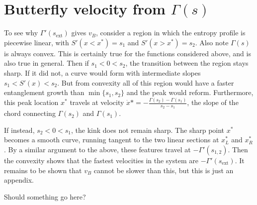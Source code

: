 \documentclass[aps,prx,reprint,superscriptaddress, longbibliography]{revtex4-1}
\newcommand{\charlie}[1]{ {\color{Magenta} {{#1}}}}
\begin{document}
\appendix
	
\section{Butterfly velocity from $\Gamma(s)$}

To see why $\Gamma'(s_\text{ext})$ gives $v_B$, consider a region in which the entropy profile is piecewise linear, with $S'(x<x^*)=s_1$ and $S'(x>x^*)=s_2$. Also note $\Gamma(s)$ is always convex. This is certainly true for the functions considered above, and is also true in general. Then if $s_1<0<s_2$, the transition between the region stays sharp. If it did not, a curve would form with intermediate slopes $s_1<S'(x)<s_2$. But from convexity all of this region would have a faster entanglement growth than $\min\{s_1,s_2\}$ and the peak would reform. Furthermore, this peak location $x^*$ travels at velocity $\dot{x}*=-\frac{\Gamma(s_2)-\Gamma(s_1)}{s_2-s_1}$, the slope of the chord connecting $\Gamma(s_2)$ and $\Gamma(s_1)$.

If instead, $s_2<0<s_1$, the kink does not remain sharp. The sharp point $x^*$ becomes a smooth curve, running tangent to the two linear sections at $x^*_L$ and $x^*_R$. By a similar argument to the above, these features travel at $-\Gamma'(s_{1,2})$. Then the convexity shows that the fastest velocities in the system are $-\Gamma'(s_\text{ext})$. It remains to be shown that $v_B$ cannot be slower than this, but this is just an appendix.



\begin{appendix}
	
\charlie{Should something go here?}

\end{appendix}
\end{document}
